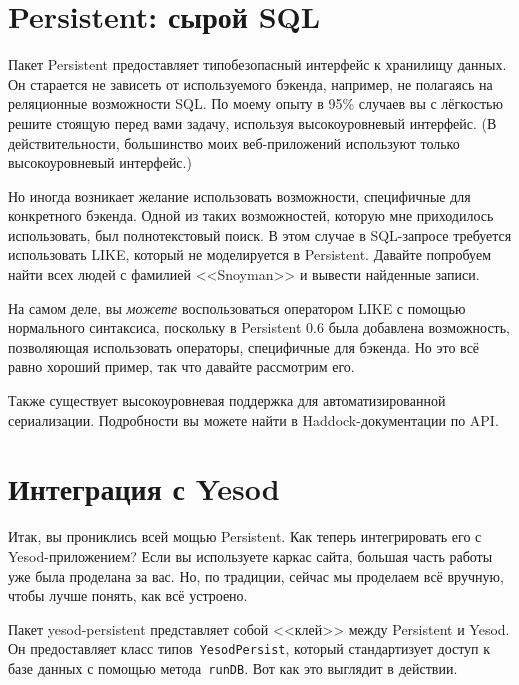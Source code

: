 \section{Persistent: сырой SQL}

Пакет Persistent предоставляет типобезопасный интерфейс к хранилищу данных. Он
старается не зависеть от используемого бэкенда, например, не полагаясь на
реляционные возможности SQL. По моему опыту в 95\% случаев вы с лёгкостью
решите стоящую перед вами задачу, используя высокоуровневый интерфейс. (В
действительности, большинство моих веб-приложений используют только
высокоуровневый интерфейс.)

Но иногда возникает желание использовать возможности, специфичные для
конкретного бэкенда. Одной из таких возможностей, которую мне приходилось
использовать, был полнотекстовый поиск. В этом случае в SQL-запросе требуется
использовать LIKE, который не моделируется в Persistent. Давайте попробуем
найти всех людей с фамилией <<Snoyman>> и вывести найденные записи.

\begin{remark}
    На самом деле, вы \emph{можете} воспользоваться оператором LIKE с помощью
    нормального синтаксиса, поскольку в Persistent 0.6 была добавлена
    возможность, позволяющая использовать операторы, специфичные для бэкенда.
    Но это всё равно хороший пример, так что давайте рассмотрим его.
\end{remark}


Также существует высокоуровневая поддержка для автоматизированной сериализации.
Подробности вы можете найти в Haddock-документации по API.

\section{Интеграция с Yesod}

Итак, вы прониклись всей мощью Persistent. Как теперь интегрировать его с
Yesod-приложением? Если вы используете каркас сайта, большая часть работы уже
была проделана за вас. Но, по традиции, сейчас мы проделаем всё вручную, чтобы
лучше понять, как всё устроено.

Пакет yesod-persistent представляет собой <<клей>> между Persistent и Yesod. Он
предоставляет класс типов~\lstinline'YesodPersist', который стандартизует
доступ к базе данных с помощью метода~\lstinline'runDB'. Вот как это выглядит в
действии.


